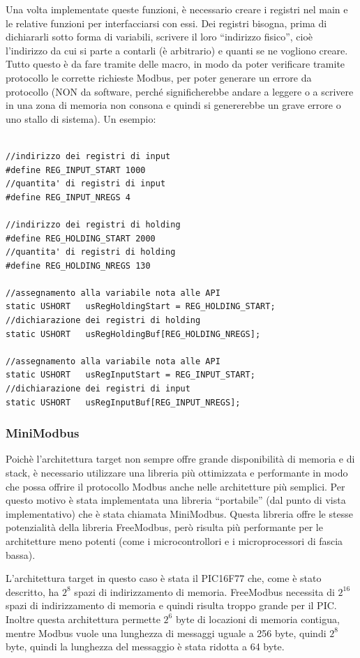 \documentclass[a4paper,titlepage]{book}
\begin{document}
Una volta implementate queste funzioni, è necessario creare i registri nel main e le relative funzioni per interfacciarsi con essi. Dei registri bisogna, prima di dichiararli sotto forma di variabili, scrivere il loro ``indirizzo fisico'', cioè l'indirizzo da cui si parte a contarli (è arbitrario) e quanti se ne vogliono creare. Tutto questo è da fare tramite delle macro, in modo da poter verificare tramite protocollo le corrette richieste Modbus, per poter generare un errore da protocollo (NON da software, perché significherebbe andare a leggere o a scrivere in una zona di memoria non consona e quindi si genererebbe un grave errore o uno stallo di sistema). Un esempio:

\begin{lstlisting}

//indirizzo dei registri di input
#define REG_INPUT_START 1000
//quantita' di registri di input	
#define REG_INPUT_NREGS 4	

//indirizzo dei registri di holding
#define REG_HOLDING_START 2000
//quantita' di registri di holding	
#define REG_HOLDING_NREGS 130	

//assegnamento alla variabile nota alle API
static USHORT   usRegHoldingStart = REG_HOLDING_START;
//dichiarazione dei registri di holding	
static USHORT   usRegHoldingBuf[REG_HOLDING_NREGS];	

//assegnamento alla variabile nota alle API
static USHORT   usRegInputStart = REG_INPUT_START;
//dichiarazione dei registri di input	
static USHORT   usRegInputBuf[REG_INPUT_NREGS];		

\end{lstlisting}


\subsubsection{MiniModbus}

Poichè l'architettura target non sempre offre grande disponibilità di memoria e di stack, è necessario utilizzare una libreria più ottimizzata e performante in modo che possa offrire il protocollo Modbus anche nelle architetture più semplici. Per questo motivo è stata implementata una libreria ``portabile'' (dal punto di vista implementativo) che è stata chiamata MiniModbus. Questa libreria offre le stesse potenzialità della libreria FreeModbus, però risulta più performante per le architetture meno potenti (come i microcontrollori e i microprocessori di fascia bassa).

L'architettura target in questo caso è stata il PIC16F77 che, come è stato descritto, ha $2^8$ spazi di indirizzamento di memoria. FreeModbus necessita di $2^{16}$ spazi di indirizzamento di memoria e quindi risulta troppo grande per il PIC. Inoltre questa architettura permette $2^6$ byte di locazioni di memoria contigua, mentre Modbus vuole una lunghezza di messaggi uguale a 256 byte, quindi $2^8$ byte, quindi la lunghezza del messaggio è stata ridotta a 64 byte. 
\end{document}
